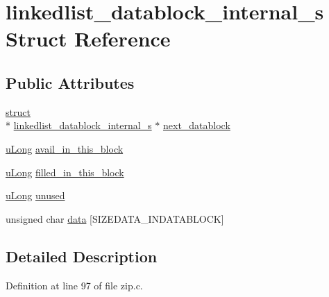 \hypertarget{structlinkedlist__datablock__internal__s}{\section{linkedlist\-\_\-datablock\-\_\-internal\-\_\-s Struct Reference}
\label{structlinkedlist__datablock__internal__s}
}
\subsection*{Public Attributes}
\begin{DoxyCompactItemize}
\item 
\hyperlink{sdlgamepad_8dox_aba655c5729da86df745f0c8e7f9ba8d2}{struct} \\*
\hyperlink{structlinkedlist__datablock__internal__s}{linkedlist\-\_\-datablock\-\_\-internal\-\_\-s} $\ast$ \hyperlink{structlinkedlist__datablock__internal__s_a1f5abadbf41d82b8724a048a33c4c153}{next\-\_\-datablock}
\item 
\hyperlink{zconf_8h_a154b3b80120c903a368fec5f11f3007a}{u\-Long} \hyperlink{structlinkedlist__datablock__internal__s_a1d63f75d88f05ee665221ccf618a57ed}{avail\-\_\-in\-\_\-this\-\_\-block}
\item 
\hyperlink{zconf_8h_a154b3b80120c903a368fec5f11f3007a}{u\-Long} \hyperlink{structlinkedlist__datablock__internal__s_a76ae854b6029e6617c7544d2eb311f77}{filled\-\_\-in\-\_\-this\-\_\-block}
\item 
\hyperlink{zconf_8h_a154b3b80120c903a368fec5f11f3007a}{u\-Long} \hyperlink{structlinkedlist__datablock__internal__s_ae7275ad9d24cbe4f4c062f29abfb3b91}{unused}
\item 
unsigned char \hyperlink{structlinkedlist__datablock__internal__s_a04900ee41fa2247a73b7570ec162bb1d}{data} \mbox{[}S\-I\-Z\-E\-D\-A\-T\-A\-\_\-\-I\-N\-D\-A\-T\-A\-B\-L\-O\-C\-K\mbox{]}
\end{DoxyCompactItemize}


\subsection{Detailed Description}


Definition at line 97 of file zip.\-c.



